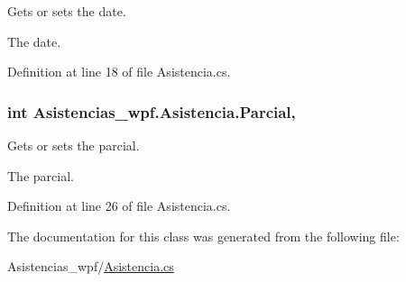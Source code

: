 Gets or sets the date. 

The date. 

Definition at line 18 of file Asistencia.\-cs.

\hypertarget{class_asistencias__wpf_1_1_asistencia_a96e386adc754b6dff8756e27ba0fdbf8}{
\subsubsection[{Parcial}]{\setlength{\rightskip}{0pt plus 5cm}int Asistencias\-\_\-wpf.\-Asistencia.\-Parcial\hspace{0.3cm}{\ttfamily [get]}, {\ttfamily [set]}}}\label{class_asistencias__wpf_1_1_asistencia_a96e386adc754b6dff8756e27ba0fdbf8}


Gets or sets the parcial. 

The parcial. 

Definition at line 26 of file Asistencia.\-cs.



The documentation for this class was generated from the following file\-:\begin{DoxyCompactItemize}
\item 
Asistencias\-\_\-wpf/\hyperlink{_asistencia_8cs}{Asistencia.\-cs}\end{DoxyCompactItemize}
